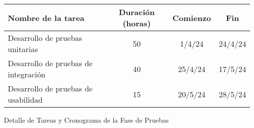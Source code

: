 \begin{planificacion}
	\centering
	\begin{tabular}{ | m{9cm} | c | c | c |}
		\hline
		\textbf{Nombre de la tarea}          & \textbf{Duración (horas)} & \textbf{Comienzo} & \textbf{Fin} \\
		\hline
		Desarrollo de pruebas unitarias      & 50                        & 1/4/24            & 24/4/24      \\
		\hline
		Desarrollo de pruebas de integración & 40                        & 25/4/24           & 17/5/24      \\
		\hline
		Desarrollo de pruebas de usabilidad  & 15                        & 20/5/24           & 28/5/24      \\
		\hline
	\end{tabular}
	\caption{Detalle de Tareas y Cronograma de la Fase de Pruebas}
\end{planificacion}
